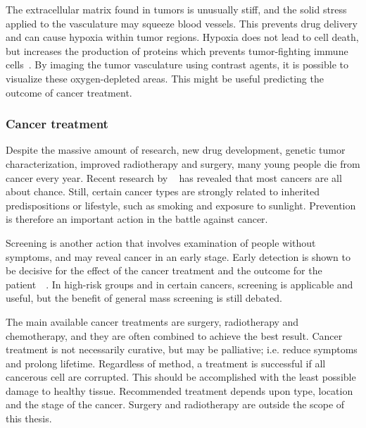The extracellular matrix found in tumors is unusually stiff, and the solid stress applied to the vasculature may  squeeze blood vessels. This prevents drug delivery and can cause hypoxia within tumor regions. Hypoxia does not lead to cell death, but increases the production of proteins which prevents tumor-fighting immune cells~\cite{Jain2014}. By imaging the tumor vasculature using contrast agents, it is possible to visualize these oxygen-depleted areas. This might be useful predicting the outcome of cancer treatment. 


\subsubsection{Cancer treatment}

Despite the massive amount of research, new drug development, genetic tumor characterization, improved radiotherapy and surgery, many young people die from cancer every year. Recent research by ~\citet{Tomasetti2014} has revealed that most cancers are all about chance. Still, certain cancer types are strongly related to inherited predispositions or  lifestyle, such as smoking and exposure to sunlight. Prevention is therefore an important action in the battle against cancer.  

Screening is another action that involves examination of people without symptoms, and may reveal cancer in an early stage. Early detection is shown to be decisive for the effect of the cancer treatment and the outcome for the patient~\cite{king2006cancer}~\cite{Jordan1986}. In high-risk groups and in certain cancers,  screening is applicable and useful, but the benefit of general mass screening is still debated. 

The main available cancer treatments are surgery, radiotherapy and chemotherapy, and they are often combined to achieve the best result. Cancer treatment is not necessarily curative, but may be palliative; i.e. reduce symptoms and prolong lifetime. Regardless of method, a treatment is successful if all cancerous cell are corrupted. This should be accomplished with the least possible damage to healthy tissue. Recommended treatment depends upon type, location and the stage of the cancer. Surgery and radiotherapy are outside the scope of this thesis.


